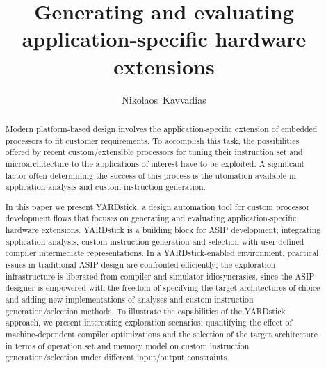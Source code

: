 \documentclass{comjnl}
\begin{document}
\title[Generating and evaluating application-specific hardware extensions]{Generating and evaluating application-specific hardware extensions}
\author{Nikolaos~Kavvadias}
 




\begin{abstract}
Modern platform-based design involves the application-specific extension of embedded processors to fit customer requirements. To accomplish this task, the possibilities offered by recent custom/extensible processors for tuning their instruction set and microarchitecture to the applications of interest have to be exploited. A significant factor often determining the success of this process is the utomation available in application analysis and custom instruction generation. 

In this paper we present YARDstick, a design automation tool for custom processor development flows that focuses on generating and evaluating application-specific hardware extensions. YARDstick is a building block for ASIP development, integrating application analysis, custom instruction generation and selection with user-defined compiler intermediate representations. In a YARDstick-enabled environment, practical issues in traditional ASIP design are confronted efficiently; the exploration infrastructure is liberated from compiler and simulator idiosyncrasies, since the ASIP designer is empowered with the freedom of specifying the target architectures of choice and adding new implementations of analyses and custom instruction generation/selection methods. To illustrate the capabilities of the YARDstick approach, we present interesting exploration scenarios: quantifying the effect of machine-dependent compiler optimizations and the selection of the target architecture in terms of operation set and memory model on custom instruction generation/selection under different input/output constraints.
\end{abstract}

\maketitle
\end{document}
